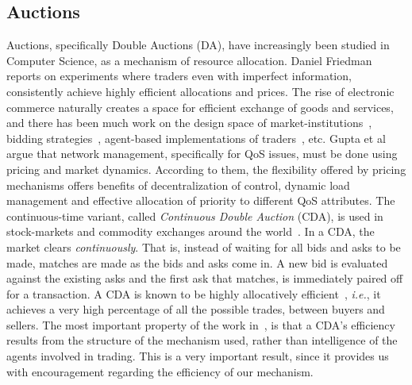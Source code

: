 \documentclass[10pt,journal,compsoc]{IEEEtran}
\begin{document}
\subsection{Auctions}
Auctions, specifically Double Auctions (DA), have increasingly been studied in Computer Science, as a mechanism of resource allocation. Daniel Friedman~\cite{Freidman1993Double} reports on experiments where traders even with imperfect information, consistently achieve highly efficient allocations and prices. The rise of electronic commerce naturally creates a space for efficient exchange of goods and services, and there has been much work on the design space of market-institutions~\cite{Wurman2001Parametrization, Niu2008Characterizing}, bidding strategies~\cite{Cliff1998Simple, Roth1995Learning}, agent-based implementations of traders~\cite{Jennings2000Automated, He2003SouthamptonTAC, He2003agent-mediated, Niu2010What}, etc. Gupta et al~\cite{Gupta1999economics} argue that network management, specifically for QoS issues, must be done using pricing and market dynamics. According to them, the flexibility offered by pricing mechanisms offers benefits of decentralization of control, dynamic load management and effective allocation of priority to different QoS attributes. The continuous-time variant, called \textit{Continuous Double Auction} (CDA), is used in stock-markets and commodity exchanges around the world~\cite{Klemperer1999Auction}. In a CDA, the market clears \textit{continuously}. That is, instead of waiting for all bids and asks to be made, matches are made as the bids and asks come in. A new bid is evaluated against the existing asks and the first ask that matches, is immediately paired off for a transaction. A CDA is known to be highly allocatively efficient~\cite{Gode1993Allocative}, \textit{i.e.}, it achieves a very high percentage of all the possible trades, between buyers and sellers. The most important property of the work in~\cite{Gode1993Allocative}, is that a CDA's efficiency results from the structure of the mechanism used, rather than intelligence of the agents involved in trading. This is a very important result, since it provides us with encouragement regarding the efficiency of our mechanism.
\end{document}
